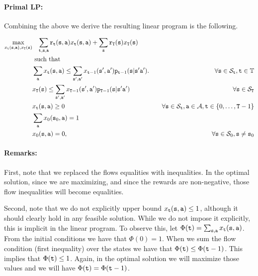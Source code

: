\paragraph{Primal LP:}
%
Combining the above we derive the resulting linear program is the following.

\begin{align*}
\max_{x_{\tt t}({\tt s},{\tt a}),x_{{\tt T}}({\tt s})}&\;\;\;
\sum_{{\tt t},{\tt s},{\tt a}}
{\tt r}_{{\tt t}}({\tt s},{\tt a})x_{{\tt t}}({\tt s},{\tt a})+\sum_{{\tt s}}{\tt r}_{{\tt T}}({\tt s})x_{{\tt T}}({\tt s})\\
&\mbox{ such that }\\
&\sum_{{\tt a}} x_{{\tt t}}({\tt s},{\tt a})\leq
\sum_{{\tt s}',{\tt a}'}
x_{{\tt t}-1}({\tt s}',{\tt a}'){\tt p}_{{\tt t}-1}({\tt s}|{\tt s}'{\tt a}').
 &\quad\forall
{\tt s} \in {\mathcal{S}_{{\tt t}}},
{\tt t}\in\mathbb{T}\\
&x_{{\tt T}}({\tt s})\leq \sum_{{\tt s}',{\tt a}'}
x_{{\tt T}-1}({\tt s}',{\tt a}'){\tt p}_{{\tt T}-1}({\tt s}|{\tt s}'{\tt a}')
&\quad\forall {\tt s} \in
{\mathcal{S}_{{\tt T}}}\\
&x_{{\tt t}}({\tt s},{\tt a}) \geq 0  &\quad\forall {\tt s} \in
{\mathcal{S}_{{\tt t}}}, {\tt a}\in\mathcal{A},
{\tt t}\in\{0,\ldots,{\tt T}-1\}\\
&\sum_{{\tt a}}x_{0}({\tt s}_0,{\tt a})=1\\
&x_{0}({\tt s},{\tt a})=0,  &\quad\forall {\tt s} \in {\mathcal{S}_{0}},
{\tt s}\neq {\tt s}_0\\
\end{align*}

\paragraph{Remarks:}
First, note that we replaced the flows equalities with inequalities.
In the optimal solution, since we are maximizing, and since the rewards are non-negative, those flow inequalities will become equalities.

Second, note that we do not explicitly upper bound 
$x_{{\tt t}}({\tt s},{\tt a}) \leq 1 $, although it should clearly hold in any feasible solution.
While we do not impose it explicitly, this is implicit in
the linear program. To observe this, let $\Phi({\tt t})= \sum_{{\tt s},{\tt a}}
x_{{\tt t}}({\tt s},{\tt a})$. From the initial conditions we have
that $\Phi(0)=1$. When we sum the flow condition
(first inequality) over the states we have that $\Phi({\tt t})\leq\Phi({\tt t}-1)$.
This implies that $\Phi({\tt t})\leq 1$.
Again, in the optimal solution we will maximize those values and we will have $\Phi({\tt t})=\Phi({\tt t}-1)$.

